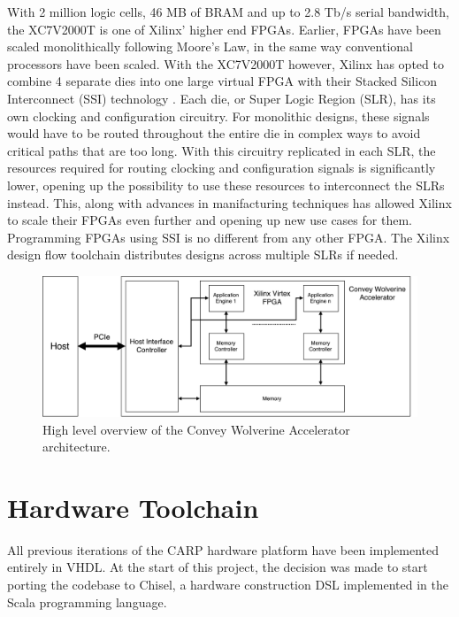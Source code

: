 With 2 million logic cells, 46 MB of BRAM and up to 2.8 Tb/s serial bandwidth,
the XC7V2000T is one of Xilinx' higher end FPGAs. Earlier, FPGAs have been
scaled monolithically following Moore's Law, in the same way conventional
processors have been scaled. With the XC7V2000T however, Xilinx has opted to
combine 4 separate dies into one large virtual FPGA with their Stacked Silicon
Interconnect (SSI) technology \cite{Saban2011}. Each die, or Super Logic Region
(SLR), has its own clocking and configuration circuitry. For monolithic designs,
these signals would have to be routed throughout the entire die in complex ways
to avoid critical paths that are too long. With this circuitry replicated in
each SLR, the resources required for routing clocking and configuration signals
is significantly lower, opening up the possibility to use these resources to
interconnect the SLRs instead. This, along with advances in manifacturing
techniques has allowed Xilinx to scale their FPGAs even further and opening up
new use cases for them. Programming FPGAs using SSI is no different from any
other FPGA. The Xilinx design flow toolchain distributes designs across multiple
SLRs if needed.


\begin{figure}[ht]
  \centering
  \includegraphics[width=\linewidth]{fig/convey-wx-card}
  \caption[Convey Wolverine Accelerator architecture]{
    High level overview of the Convey Wolverine Accelerator architecture.
    \label{fig:convey-wx-card}
  }
\end{figure}


\section{Hardware Toolchain}
\label{sec:hw-toolchain}

All previous iterations of the CARP hardware platform have been implemented
entirely in VHDL. At the start of this project, the decision was made to start
porting the codebase to Chisel, a hardware construction DSL implemented in the
Scala programming language.

